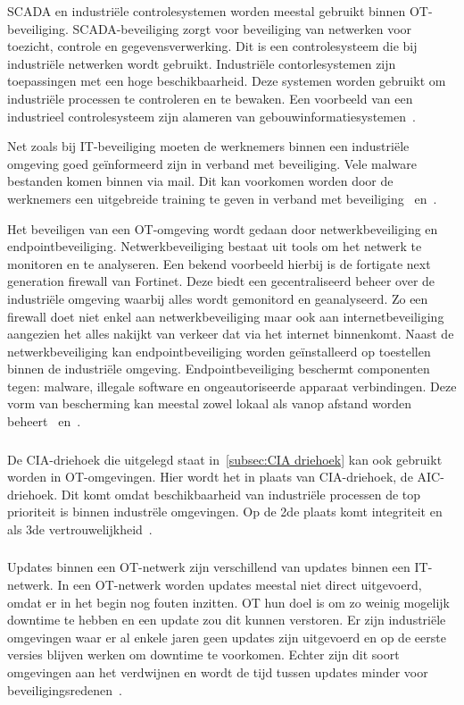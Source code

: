SCADA en industriële controlesystemen worden meestal gebruikt binnen OT-beveiliging. SCADA-beveiliging zorgt voor beveiliging van netwerken voor toezicht, controle en gegevensverwerking. Dit is een controlesysteem die bij industriële netwerken wordt gebruikt. Industriële contorlesystemen zijn toepassingen met een hoge beschikbaarheid. Deze systemen worden gebruikt om industriële processen te controleren en te bewaken. Een voorbeeld van een industrieel controlesysteem zijn alameren van gebouwinformatiesystemen~\autocite{Infradata2019}.


Net zoals bij IT-beveiliging moeten de werknemers binnen een industriële omgeving goed geïnformeerd zijn in verband met beveiliging. Vele malware bestanden komen binnen via mail. Dit kan voorkomen worden door de werknemers een uitgebreide training te geven in verband met beveiliging~\autocite{Infradata2019} en~\autocite{Security2020}.

Het beveiligen van een OT-omgeving wordt gedaan door netwerkbeveiliging en endpointbeveiliging. Netwerkbeveiliging bestaat uit tools om het netwerk te monitoren en te analyseren. Een bekend voorbeeld hierbij is de fortigate next generation firewall van Fortinet. Deze biedt een gecentraliseerd beheer over de industriële omgeving waarbij alles wordt gemonitord en geanalyseerd. Zo een firewall doet niet enkel aan netwerkbeveiliging maar ook aan internetbeveiliging aangezien het alles nakijkt van verkeer dat via het internet binnenkomt. Naast de netwerkbeveiliging kan endpointbeveiliging worden geïnstalleerd op toestellen binnen de industriële omgeving. Endpointbeveiliging beschermt componenten tegen: malware, illegale software en ongeautoriseerde apparaat verbindingen. Deze vorm van bescherming kan meestal zowel lokaal als vanop afstand worden beheert~\autocite{Infradata2019} en~\autocite{Security2020}.

\subsubsection{}
\label{subsec:AIC driehoek}
De CIA-driehoek die uitgelegd staat in~\ref{subsec:CIA driehoek} kan ook gebruikt worden in OT-omgevingen. Hier wordt het in plaats van CIA-driehoek, de AIC-driehoek. Dit komt omdat beschikbaarheid van industriële processen de top prioriteit is binnen industrële omgevingen. Op de 2de plaats komt integriteit en als 3de vertrouwelijkheid~\autocite{Max2020}.   
\subsubsection{}
\label{subsec:Updates OT}
Updates binnen een OT-netwerk zijn verschillend van updates binnen een IT-netwerk. In een OT-netwerk worden updates meestal niet direct uitgevoerd, omdat er in het begin nog fouten inzitten. OT hun doel is om zo weinig mogelijk downtime te hebben en een update zou dit kunnen verstoren. Er zijn industriële omgevingen waar er al enkele jaren geen updates zijn uitgevoerd en op de eerste versies blijven werken om downtime te voorkomen. Echter zijn dit soort omgevingen aan het verdwijnen en wordt de tijd tussen updates minder voor beveiligingsredenen~\autocite{Max2020}.
